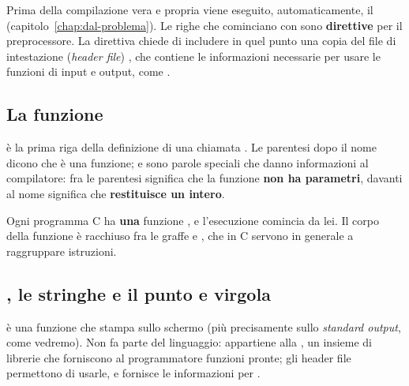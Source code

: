 Prima della compilazione vera e propria viene eseguito, automaticamente, il
 (capitolo~\ref{chap:dal-problema}). Le righe che
cominciano con \code{\#} sono \textbf{direttive} per il preprocessore. La
direttiva  chiede di includere in quel punto una
copia del file di intestazione (\textit{header file}) , che
contiene le informazioni necessarie per usare le funzioni di input e output,
come .


\subsection{La funzione }

 è la prima riga della definizione di una
 chiamata . Le parentesi dopo il nome dicono che
 è una funzione;  e  sono parole speciali
che danno informazioni al compilatore:  fra le parentesi
significa che la funzione \textbf{non ha parametri},  davanti al
nome significa che \textbf{restituisce un intero}.

Ogni programma C ha \textbf{una} funzione , e l'esecuzione
comincia da lei. Il corpo della funzione è racchiuso fra le graffe
\code{\{} e \code{\}}, che in C servono in generale a raggruppare
istruzioni.

\subsection{, le stringhe e il punto e virgola}

 è una funzione che stampa sullo schermo (più precisamente
sullo \textit{standard output}, come vedremo). Non fa parte del
linguaggio: appartiene alla , un insieme di
librerie che forniscono al programmatore funzioni pronte; gli header file
permettono di usarle, e  fornisce le informazioni per
.

